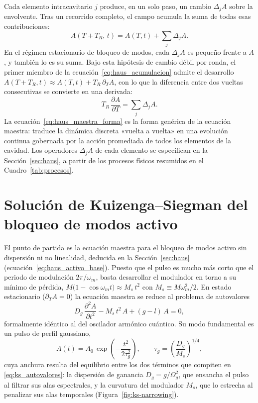 Cada elemento intracavitario $j$ produce, en un solo paso, un cambio
$\Delta_j A$ sobre la envolvente. Tras un recorrido completo, el campo acumula la
suma de todas esas contribuciones:
%
\begin{equation}
    A(T + T_R,\, t) = A(T,t) + \sum_j \Delta_j A .
    \label{eq:haus_acumulacion}
\end{equation}
%
En el régimen estacionario de bloqueo de modos, cada $\Delta_j A$ es pequeño
frente a $A$, y también lo es su suma. Bajo esta hipótesis de cambio débil por
ronda, el primer miembro de la ecuación~\eqref{eq:haus_acumulacion} admite el
desarrollo $A(T+T_R,t) \approx A(T,t) + T_R\,\partial_T A$, con lo que la
diferencia entre dos vueltas consecutivas se convierte en una derivada:
%
\begin{equation}
    T_R\,\frac{\partial A}{\partial T} = \sum_j \Delta_j A .
    \label{eq:haus_maestra_forma}
\end{equation}
%
La ecuación~\eqref{eq:haus_maestra_forma} es la forma genérica de la ecuación
maestra: traduce la dinámica discreta «vuelta a vuelta» en una evolución
continua gobernada por la acción promediada de todos los elementos de la cavidad.
Los operadores $\Delta_j A$ de cada elemento se especifican en la
Sección~\ref{sec:haus}, a partir de los procesos físicos resumidos en el
Cuadro~\ref{tab:procesos}.

\chapter{Solución de Kuizenga--Siegman del bloqueo de modos activo}
\label{app:ks}

El punto de partida es la ecuación maestra para el bloqueo de modos activo sin
dispersión ni no linealidad, deducida en la Sección~\ref{sec:haus}
(ecuación~\eqref{eq:haus_activo_base}). Puesto que el pulso es mucho más corto que
el periodo de modulación $2\pi/\omega_m$, basta desarrollar el modulador en torno
a su mínimo de pérdida, $M\bigl(1-\cos\omega_m t\bigr)\approx M_s\,t^2$ con
$M_s\equiv M\omega_m^2/2$. En estado estacionario ($\partial_T A = 0$) la ecuación
maestra se reduce al problema de autovalores
%
\begin{equation}
    D_g\,\frac{\partial^2 A}{\partial t^2}
    - M_s\,t^2\,A + (g-l)\,A = 0,
    \label{eq:ks_autovalores}
\end{equation}
%
formalmente idéntico al del oscilador armónico cuántico. Su modo fundamental es un
pulso de perfil gaussiano,
%
\begin{equation}
    A(t) = A_0\,\exp\!\left(-\frac{t^2}{2\tau_g^{2}}\right),
    \qquad
    \tau_g = \left(\frac{D_g}{M_s}\right)^{1/4},
    \label{eq:ks_gaussiano}
\end{equation}
%
cuya anchura resulta del equilibrio entre los dos términos que compiten en
\eqref{eq:ks_autovalores}: la dispersión de ganancia $D_g=g/\Omega_g^2$, que
ensancha el pulso al filtrar sus alas espectrales, y la curvatura del modulador
$M_s$, que lo estrecha al penalizar sus alas temporales
(Figura~\ref{fig:ks-narrowing}).

